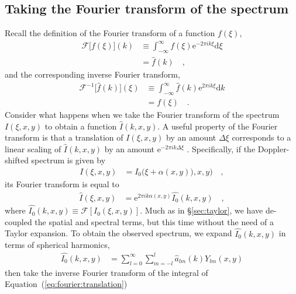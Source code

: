\documentclass[modern]{aastex62}
\begin{document}
\subsection{Taking the Fourier transform of the spectrum}
\label{sec:fourier}
%
Recall the definition of the Fourier transform of a function $f(\xi)$,
%
\begin{align}
    \label{eq:fourier:FT}
    \mathcal{F}\Big[f(\xi)\Big](k) 
    &\equiv
    \int_{-\infty}^\infty
        f(\xi)
        \mathrm{e}^{-2\pi i k \xi} \mathrm{d}\xi
    \nonumber \\
    &=
    \hat{f}(k)
    \quad ,
\end{align}
%
and the corresponding inverse Fourier transform,
%
\begin{align}
    \label{eq:fourier:IFT}
    \mathcal{F}^{-1}\Big[\hat{f}(k)\Big](\xi) 
    &\equiv
    \int_{-\infty}^\infty
        \hat{f}(k)
        \mathrm{e}^{2\pi i k \xi} \mathrm{d}k
    \nonumber \\
    &=
    f(\xi)
    \quad .
\end{align}
%
Consider what happens when we take the
Fourier transform of the spectrum $I(\xi, x, y)$ to obtain
a function $\hat{I}(k, x, y)$. A useful property of the
Fourier transform is that a translation of $I(\xi, x, y)$ by
an amount $\Delta\xi$ corresponds to a linear scaling
of $\hat{I}(k, x, y)$ by an amount $\mathrm{e}^{-2\pi i k \Delta\xi}$
\citep[e.g.,][]{Schoenstadt2006}.
Specifically, if the Doppler-shifted spectrum is given by
%
\begin{align}
    I(\xi, x, y) &= I_0\big(\xi + \alpha(x, y)\big), x, y) \quad,
\end{align}
%
its Fourier transform is equal to 
%
\begin{align}
    \label{eq:fourier:translation}
    \hat{I}(\xi, x, y) 
    &= 
    \mathrm{e}^{2\pi i k \alpha(x, y)}\hat{I_0}(k, x, y)
    \quad ,
\end{align}
%
where $\hat{I_0}(k, x, y) \equiv \mathcal{F}\left[ I_0(\xi, x, y) \right]$.
%
Much as in \S\ref{sec:taylor}, we have de-coupled the spatial and spectral
terms, but this time without the need of a Taylor expansion. To obtain
the observed spectrum, we
expand $\hat{I_0}(k, x, y)$ in terms of spherical harmonics,
%
\begin{align}
    \label{eq:fourier:I0}
    \hat{I_0}(k, x, y) 
        &=
        \sum_{l=0}^\infty\sum_{m=-l}^{l} \hat{a}_{lm}(k) Y_{lm}(x, y)
\end{align}
%
then take the inverse Fourier transform of the integral of 
Equation~(\ref{eq:fourier:translation})
\end{document}
